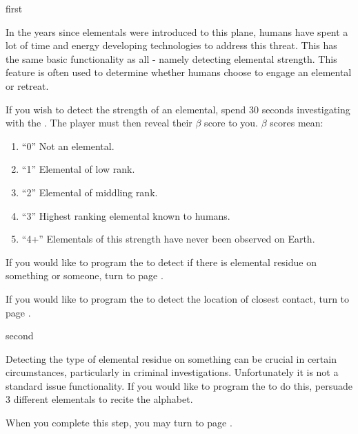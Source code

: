 \documentclass[notebook]{elementals}
\begin{document}
\startnotebook{\nTricorder{}}

\begin{page}{first}

In the years since elementals were introduced to this plane, humans have spent a lot of time and energy developing technologies to address this threat. This \iTricorder{} has the same basic functionality as all \iTricorder{} - namely detecting elemental strength. This feature is often used to determine whether humans choose to engage an elemental or retreat.

If you wish to detect the strength of an elemental, spend 30 seconds investigating with the \iTricorder{}. The player must then reveal their $\beta$ score to you. $\beta$ scores mean:
\begin{enumerate}
  \item ``0'' Not an elemental.
  \item ``1'' Elemental of low rank.
  \item ``2'' Elemental of middling rank.
  \item ``3'' Highest ranking elemental known to humans.
  \item ``4+'' Elementals of this strength have never been observed on Earth.
\end{enumerate}

If you would like to program the \iTricorder{} to detect if there is elemental residue on something or someone, turn to page .

If you would like to program the \iTricorder{} to detect the location of closest contact, turn to page .

\end{page}

\begin{page}{second}

Detecting the type of elemental residue on something can be crucial in certain circumstances, particularly in criminal investigations. Unfortunately it is not a standard issue functionality. If you would like to program the \iTricorder{} to do this, persuade 3 different elementals to recite the alphabet.

When you complete this step, you may turn to page .

\end{page}
\end{document}
